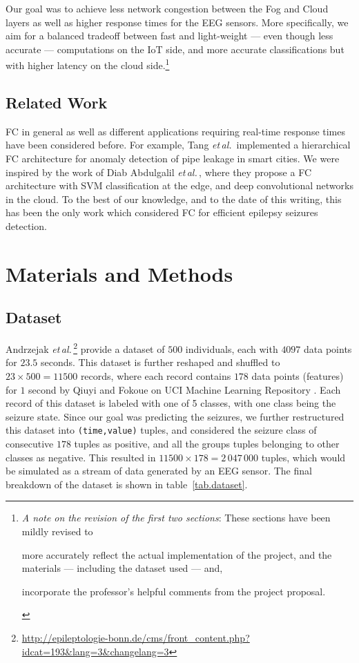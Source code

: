 \documentclass[letterpaper]{article}
\newcommand{\etal}{\emph{et\,al.}\,}
\begin{document}
Our goal was to achieve less network congestion between the Fog and Cloud layers as well as higher response times for the EEG sensors. More specifically, we aim for a balanced tradeoff between fast and light-weight --- even though less accurate --- computations on the IoT side, and more accurate classifications but with higher latency on the cloud side.\footnote{\emph{A note on the revision of the first two sections}: These sections have been mildly revised to \begin{enumerate*}[label=\arabic*)]
    \item more accurately reflect the actual implementation of the project, and the materials --- including the dataset used --- and,
    \item incorporate the professor's helpful comments from the project proposal.
  \end{enumerate*}}

\subsection{Related Work}
FC in general as well as different applications requiring real-time response times have been considered before. For example, Tang \etal\cite{Tang:2015} implemented a hierarchical FC architecture for anomaly detection of pipe leakage in smart cities. We were inspired by the work of Diab Abdulgalil \etal\cite{DiabAbdulgalil2018}, where they propose a FC architecture with SVM classification at the edge, and deep convolutional networks in the cloud. To the best of our knowledge, and to the date of this writing, this has been the only work which considered FC for efficient epilepsy seizures detection.


 \section{Materials and Methods}\label{materials}

 \subsection{Dataset}
 Andrzejak \etal\cite{PhysRevE.64.061907}\footnote{\url{http://epileptologie-bonn.de/cms/front_content.php?idcat=193&lang=3&changelang=3}} provide a dataset of \(500\) individuals, each with \(4097\) data points for \(23.5\) seconds. This dataset is further reshaped and shuffled to \(23 \times 500 = 11500\) records, where each record contains \(178\) data points (features) for \(1\) second by Qiuyi and Fokoue on UCI Machine Learning Repository \cite{UCIDataset}. Each record of this dataset is labeled with one of 5 classes, with one class being the seizure state. Since our goal was predicting the seizures, we further restructured this dataset into \texttt{(time,value)} tuples, and considered the seizure class of consecutive \(178\) tuples as positive, and all the groups tuples belonging to other classes as negative. This resulted in \(11500 \times 178 = 2\,047\,000\) tuples, which would be simulated as a stream of data generated by an EEG sensor. The final breakdown of the dataset is shown in table~\ref{tab.dataset}.
\end{document}

